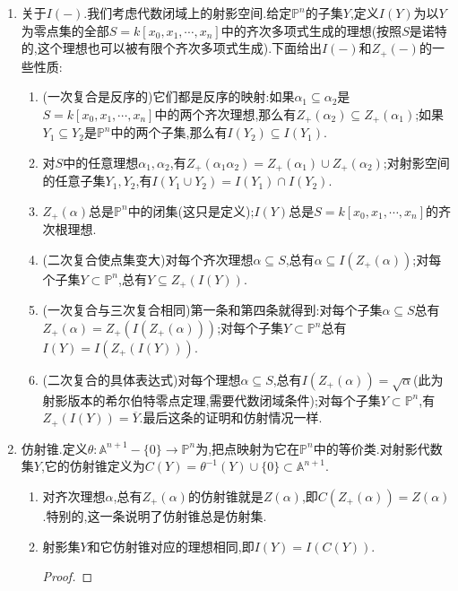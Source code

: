 \begin{enumerate}
\begin{proof}
    	按照$C(Z_+(\alpha))=Z(\alpha)$,从$f$以$Z_+(\alpha)$中每个点为零点得到$f$以$Z(\alpha)\subset\mathbb{A}^{n+1}$中每个点为零点,于是按照仿射版本的零点定理,得到存在某个次幂$f^r\in\alpha$.
    \end{proof}
    \item 关于$I(-)$.我们考虑代数闭域上的射影空间.给定$\mathbb{P}^n$的子集$Y$,定义$I(Y)$为以$Y$为零点集的全部$S=k[x_0,x_1,\cdots,x_n]$中的齐次多项式生成的理想(按照$S$是诺特的,这个理想也可以被有限个齐次多项式生成).下面给出$I(-)$和$Z_+(-)$的一些性质:
    \begin{enumerate}
    	\item (一次复合是反序的)它们都是反序的映射:如果$\alpha_1\subseteq \alpha_2$是$S=k[x_0,x_1,\cdots,x_n]$中的两个齐次理想,那么有$Z_+(\alpha_2)\subseteq Z_+(\alpha_1)$;如果$Y_1\subseteq Y_2$是$\mathbb{P}^n$中的两个子集,那么有$I(Y_2)\subseteq I(Y_1)$.
    	\item 对$S$中的任意理想$\alpha_1,\alpha_2$,有$Z_+(\alpha_1\alpha_2)=Z_+(\alpha_1)\cup Z_+(\alpha_2)$;对射影空间的任意子集$Y_1,Y_2$,有$I(Y_1\cup Y_2)=I(Y_1)\cap I(Y_2)$.
    	\item $Z_+(\alpha)$总是$\mathbb{P}^n$中的闭集(这只是定义);$I(Y)$总是$S=k[x_0,x_1,\cdots,x_n]$的齐次根理想.
    	\item (二次复合使点集变大)对每个齐次理想$\alpha\subseteq S$,总有$\alpha\subseteq I(Z_+(\alpha))$;对每个子集$Y\subset\mathbb{P}^n$,总有$Y\subseteq Z_+(I(Y))$.
    	\item (一次复合与三次复合相同)第一条和第四条就得到:对每个子集$\alpha\subseteq S$总有$Z_+(\alpha)=Z_+(I(Z_+(\alpha)))$;对每个子集$Y\subset\mathbb{P}^n$总有$I(Y)=I(Z_+(I(Y)))$.
    	\item (二次复合的具体表达式)对每个理想$\alpha\subseteq S$,总有$I(Z_+(\alpha))=\sqrt{\alpha}$(此为射影版本的希尔伯特零点定理,需要代数闭域条件);对每个子集$Y\subset\mathbb{P}^n$,有$Z_+(I(Y))=\overline{Y}$.最后这条的证明和仿射情况一样.
    \end{enumerate}
    \item 仿射锥.定义$\theta:\mathbb{A}^{n+1}-\{0\}\to\mathbb{P}^n$为,把点映射为它在$\mathbb{P}^n$中的等价类.对射影代数集$Y$,它的仿射锥定义为$C(Y)=\theta^{-1}(Y)\cup\{0\}\subset\mathbb{A}^{n+1}$.
    \begin{enumerate}
    	\item 对齐次理想$\alpha$,总有$Z_+(\alpha)$的仿射锥就是$Z(\alpha)$,即$C(Z_+(\alpha))=Z(\alpha)$.特别的,这一条说明了仿射锥总是仿射集.
    	\item 射影集$Y$和它仿射锥对应的理想相同,即$I(Y)=I(C(Y))$.
    	\begin{proof}
    		

\end{proof}
\end{enumerate}
\end{enumerate}
